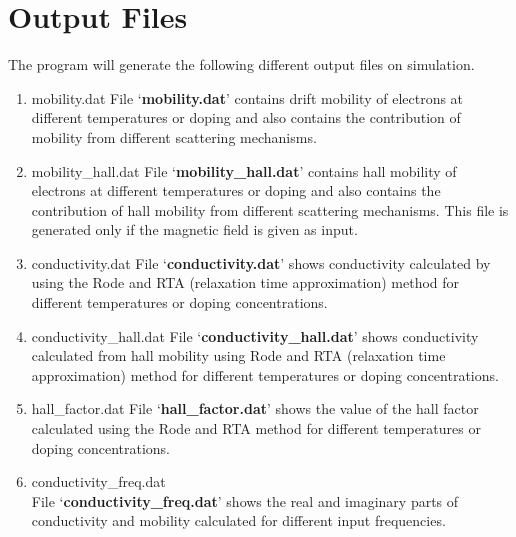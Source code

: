 \documentclass[12pt]{article}
\begin{document}
\section{Output Files}  \label{output_files}
The program will generate the following different output files on simulation.
\begin{enumerate}

\item mobility.dat
\newline File \lq \textbf{mobility.dat}\rq \hspace{0.5mm} contains drift mobility of electrons at different temperatures or doping and also contains the contribution of mobility from different scattering mechanisms.

\item mobility\_hall.dat
\newline File \lq \textbf{mobility\_hall.dat}\rq \hspace{0.5mm} contains hall mobility of electrons at different temperatures or doping and also contains the contribution of hall mobility from different scattering mechanisms. This file is generated only if the magnetic field is given as input.

\item conductivity.dat
\newline File \lq \textbf{conductivity.dat}\rq \hspace{0.5mm} shows conductivity calculated by using the Rode and RTA (relaxation time approximation) method for different temperatures or doping concentrations. 

\item conductivity\_hall.dat 
\newline File \lq \textbf{conductivity\_hall.dat}\rq \hspace{0.5mm} shows conductivity calculated from hall mobility using Rode and RTA (relaxation time approximation) method for different temperatures or doping concentrations. 

\item hall\_factor.dat
\newline File \lq \textbf{hall\_factor.dat}\rq \hspace{0.5mm} shows the value of the hall factor calculated using the Rode and RTA method for different temperatures or doping concentrations.

\item conductivity\_freq.dat \\
File \lq \textbf{conductivity\_freq.dat}\rq \hspace{0.5mm} shows the real and imaginary parts of conductivity and mobility calculated for different input frequencies.


\end{enumerate}
\end{document}
